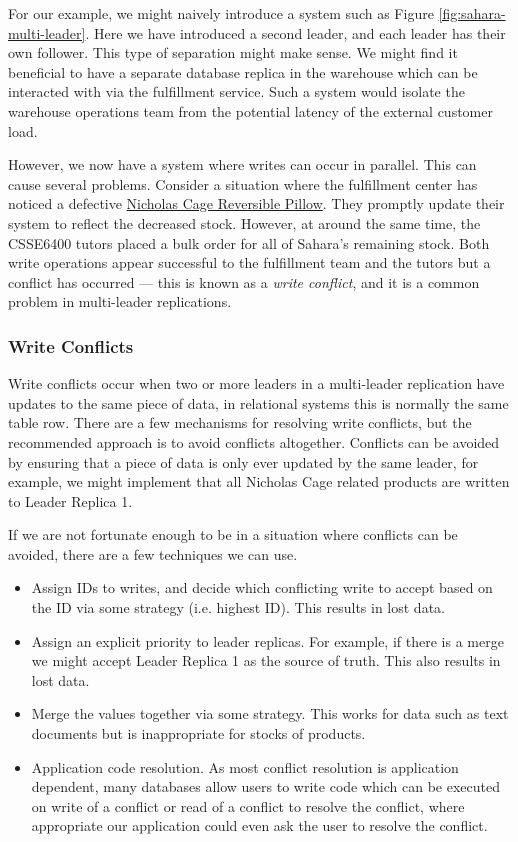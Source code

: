 For our example,
we might naively introduce a system such as Figure \ref{fig:sahara-multi-leader}.
Here we have introduced a second leader,
and each leader has their own follower.
This type of separation might make sense.
We might find it beneficial to have a separate database replica in the warehouse which can be interacted with via the fulfillment service.
Such a system would isolate the warehouse operations team from the potential latency of the external customer load.

However, we now have a system where writes can occur in parallel.
This can cause several problems.
Consider a situation where the fulfillment center has noticed a defective \href{https://www.amazon.com.au/dp/B09LYDDDR1}{Nicholas Cage Reversible Pillow}.
They promptly update their system to reflect the decreased stock.
However, at around the same time,
the CSSE6400 tutors placed a bulk order for all of Sahara's remaining stock.
Both write operations appear successful to the fulfillment team and the tutors but a conflict has occurred --- this is known as a \textsl{write conflict},
and it is a common problem in multi-leader replications. 

\subsubsection*{Write Conflicts}
Write conflicts occur when two or more leaders in a multi-leader replication have updates to the same piece of data,
in relational systems this is normally the same table row.
There are a few mechanisms for resolving write conflicts,
but the recommended approach is to avoid conflicts altogether.
Conflicts can be avoided by ensuring that a piece of data is only ever updated by the same leader,
for example, we might implement that all Nicholas Cage related products are written to Leader Replica 1.

If we are not fortunate enough to be in a situation where conflicts can be avoided,
there are a few techniques we can use.

\begin{itemize}
    \item Assign IDs to writes, and decide which conflicting write to accept based on the ID via some strategy (i.e. highest ID). This results in lost data.
    \item Assign an explicit priority to leader replicas. For example, if there is a merge we might accept Leader Replica 1 as the source of truth. This also results in lost data.
    \item Merge the values together via some strategy. This works for data such as text documents but is inappropriate for stocks of products.
    \item Application code resolution. As most conflict resolution is application dependent, many databases allow users to write code which can be executed on write of a conflict or read of a conflict to resolve the conflict, where appropriate our application could even ask the user to resolve the conflict.
\end{itemize}

